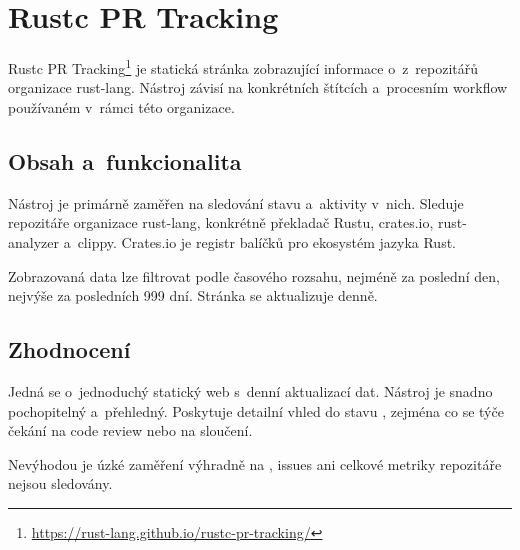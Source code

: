 
\section{Rustc PR Tracking}
\label{sec:rustc_pr_tracking}

Rustc PR Tracking\footnote{\url{https://rust-lang.github.io/rustc-pr-tracking/}} je statická stránka zobrazující informace o~\PR z~repozitářů organizace rust-lang. Nástroj závisí na konkrétních štítcích a~procesním workflow používaném v~rámci této organizace.

\subsection*{Obsah a~funkcionalita}
\label{subsec:rustc_pr_tracking:content}

Nástroj je primárně zaměřen na sledování stavu \PR a~aktivity v~nich. Sleduje repozitáře organizace rust-lang, konkrétně překladač Rustu, crates.io, rust-analyzer a~clippy. Crates.io je registr balíčků pro ekosystém jazyka Rust.

Zobrazovaná data lze filtrovat podle časového rozsahu, nejméně za poslední den, nejvýše za posledních 999 dní. Stránka se aktualizuje denně.

\subsection*{Zhodnocení}
\label{subsec:rustc_pr_tracking:evaluation}

Jedná se o~jednoduchý statický web s~denní aktualizací dat. Nástroj je snadno pochopitelný a~přehledný. Poskytuje detailní vhled do stavu \PR, zejména co se týče čekání na code review nebo na sloučení.

Nevýhodou je úzké zaměření výhradně na \PR, issues ani celkové metriky repozitáře nejsou sledovány.
